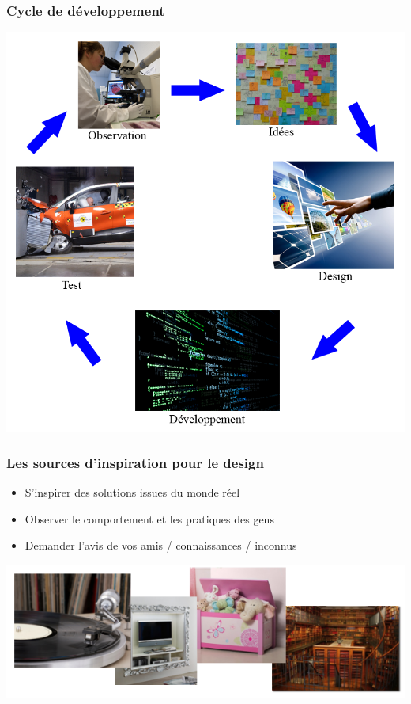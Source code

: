 \documentclass{beamer}
\begin{document}
\begin{frame}
\frametitle{Cycle de développement}
\begin{center}
\includegraphics[scale=0.25]{cour_android_1.png}
\end{center}
\end{frame}

\begin{frame}
\frametitle{Les sources d'inspiration pour le design}

\begin{itemize}
	\item S'inspirer des solutions issues du monde réel
	\item Observer le comportement et les pratiques des gens
	\item Demander l'avis de vos amis / connaissances / inconnus
\end{itemize}

\begin{center}
\includegraphics[scale=0.5]{design_ins.png}
\end{center}
\end{frame}
\end{document}
